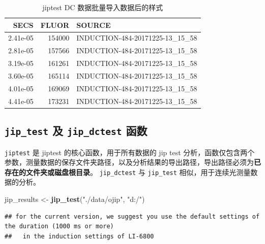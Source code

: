 \documentclass[]{krantz}
\makeatletter
\newenvironment{Shaded}{\begin{snugshade}}{\end{snugshade}}
\newcommand{\KeywordTok}[1]{\textcolor[rgb]{0.13,0.29,0.53}{\textbf{#1}}}
\newcommand{\StringTok}[1]{\textcolor[rgb]{0.31,0.60,0.02}{#1}}
\newcommand{\NormalTok}[1]{#1}
\newenvironment{kframe}{%
\medskip{}
\setlength{\fboxsep}{.8em}
 \def\at@end@of@kframe{}%
 \ifinner\ifhmode%
  \def\at@end@of@kframe{\end{minipage}}%
  \begin{minipage}{\columnwidth}%
 \fi\fi%
 \def\FrameCommand##1{\hskip\@totalleftmargin \hskip-\fboxsep
 \colorbox{shadecolor}{##1}\hskip-\fboxsep
     \hskip-\linewidth \hskip-\@totalleftmargin \hskip\columnwidth}%
 \MakeFramed {\advance\hsize-\width
   \@totalleftmargin\z@ \linewidth\hsize
   \@setminipage}}%
 {\par\unskip\endMakeFramed%
 \at@end@of@kframe}
\renewenvironment{Shaded}{\begin{kframe}}{\end{kframe}}
\theoremstyle{definition}
\theoremstyle{definition}
\theoremstyle{definition}
\theoremstyle{remark}
\makeatother
\begin{document}
\begin{table}

\caption{\label{tab:unnamed-chunk-26}jiptest DC 数据批量导入数据后的样式}
\centering
\begin{tabular}[t]{rrl}
\toprule
SECS & FLUOR & SOURCE\\
\midrule
2.41e-05 & 154000 & INDUCTION-484-20171225-13\_15\_58\\
2.81e-05 & 157566 & INDUCTION-484-20171225-13\_15\_58\\
3.19e-05 & 161261 & INDUCTION-484-20171225-13\_15\_58\\
3.60e-05 & 165114 & INDUCTION-484-20171225-13\_15\_58\\
4.01e-05 & 169069 & INDUCTION-484-20171225-13\_15\_58\\
4.41e-05 & 173231 & INDUCTION-484-20171225-13\_15\_58\\
\bottomrule
\end{tabular}
\end{table}

\subsection{\texorpdfstring{\texttt{jip\_test} 及 \texttt{jip\_dctest}
函数}{jip\_test 及 jip\_dctest 函数}}\label{testfluor}

\texttt{jiptest} 是 jiptest 的核心函数，用于所有数据的 jip test
分析，函数仅包含两个参数，测量数据的保存文件夹路径，以及分析结果的导出路径，导出路径必须为\textbf{已存在的文件夹或磁盘根目录}。
\texttt{jip\_dctest} 与 \texttt{jip\_test}
相似，用于连续光测量数据的分析。

\begin{Shaded}
\begin{Highlighting}[]
\NormalTok{jip_results <-}\StringTok{ }\KeywordTok{jip_test}\NormalTok{(}\StringTok{"./data/ojip"}\NormalTok{, }\StringTok{"d:/"}\NormalTok{)}
\end{Highlighting}
\end{Shaded}

\begin{verbatim}
## for the current version, we suggest you use the default settings of the duration (1000 ms or more)
##   in the induction settings of LI-6800
\end{verbatim}
\end{document}
